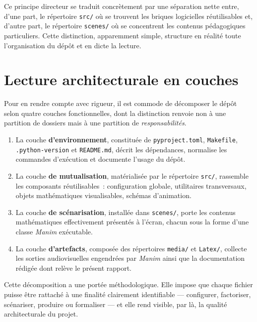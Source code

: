 \documentclass[12pt, a4paper, openany]{report}
\begin{document}
	Ce principe directeur se traduit concrètement par une séparation nette entre, d’une part, le répertoire \texttt{src/} où se trouvent les briques logicielles réutilisables et, d’autre part, le répertoire \texttt{scenes/} où se concentrent les contenus pédagogiques particuliers. Cette distinction, apparemment simple, structure en réalité toute l’organisation du dépôt et en dicte la lecture.
	
	\section{Lecture architecturale en couches}

	Pour en rendre compte avec rigueur, il est commode de décomposer le dépôt selon quatre couches fonctionnelles, dont la distinction renvoie non à une partition de dossiers mais à une partition de \emph{responsabilités}.

	\begin{enumerate}
		\item La couche \textbf{d’environnement}, constituée de \texttt{pyproject.toml}, \texttt{Makefile}, \texttt{.python-version} et \texttt{README.md}, décrit les dépendances, normalise les commandes d’exécution et documente l’usage du dépôt.
		\item La couche \textbf{de mutualisation}, matérialisée par le répertoire \texttt{src/}, rassemble les composants réutilisables~: configuration globale, utilitaires transversaux, objets mathématiques visualisables, schémas d’animation.
		\item La couche \textbf{de scénarisation}, installée dans \texttt{scenes/}, porte les contenus mathématiques effectivement présentés à l’écran, chacun sous la forme d’une classe \textit{Manim} exécutable.
		\item La couche \textbf{d’artefacts}, composée des répertoires \texttt{media/} et \texttt{Latex/}, collecte les sorties audiovisuelles engendrées par \textit{Manim} ainsi que la documentation rédigée dont relève le présent rapport.
	\end{enumerate}

	Cette décomposition a une portée méthodologique. Elle impose que chaque fichier puisse être rattaché à une finalité clairement identifiable — configurer, factoriser, scénariser, produire ou formaliser — et elle rend visible, par là, la qualité architecturale du projet.
	
\end{document}
